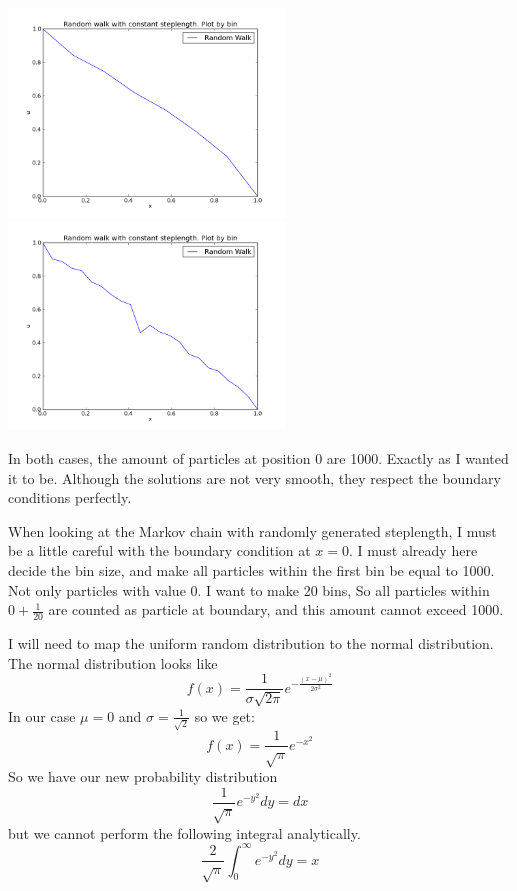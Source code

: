 \documentclass[a4paper, 12pt, titlepage]{article}
\newcommand{\f}[2]{\frac{#1}{#2}}
\newcommand{\beq}{\begin{equation*}}
\newcommand{\eeq}{\end{equation*}}
\begin{document}
\begin{section}
\begin{subsection}
  \includegraphics[width=0.55\textwidth]{build-main-Desktop-Debug/MC_uniform.png}{\centering}
  \includegraphics[width=0.55\textwidth]{build-main-Desktop-Debug/MC_uniform_low_dt.png}{\centering}
  
  In both cases, the amount of particles at position 0 are 1000. Exactly as I wanted it to be. Although
  the solutions are not very smooth, they respect the boundary conditions perfectly.
  
  When looking at the Markov chain with randomly generated steplength, I must be a little careful with
  the boundary condition at $x = 0$. I must already here decide the bin size, and make all particles within
  the first bin be equal to 1000. Not only particles with value $0$. 
  I want to make 20 bins, So all particles within $0 + \frac{1}{20} $ are counted as particle at boundary,
  and this amount cannot exceed 1000. 
  
  I will need to map the uniform random distribution to the normal distribution. The normal distribution
  looks like 
  \beq f(x) = \f{1}{\sigma \sqrt{2\pi}} e^{-\f{(x-\mu)^2}{2\sigma ^2}} \eeq
  In our case $\mu = 0$ and $\sigma = \frac{1}{\sqrt{2}}$ so we get:
  \beq f(x) = \f{1}{\sqrt{\pi}} e^{-x^2} \eeq
  So we have our new probability distribution \beq \f{1}{\sqrt{\pi}} e^{-y^2} dy = dx \eeq
  but we cannot perform the following integral analytically. \beq \f{2}{\sqrt{\pi}} \int_0^{\infty} e^{-y^2} dy = x \eeq 
  

\end{subsection}
\end{section}
\end{document}
